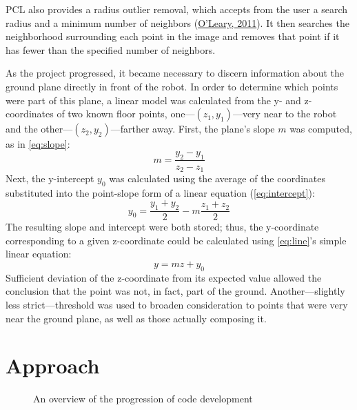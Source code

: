 \documentclass[12pt]{report}
\begin{document}
PCL also provides a radius outlier removal, which accepts from the user a search radius and a minimum number of neighbors (\hyperref[bib:oleary]{O'Leary, 2011}).  It then searches the neighborhood surrounding each point in the image and removes that point if it has fewer than the specified number of neighbors.

As the project progressed, it became necessary to discern information about the ground plane directly in front of the robot.  In order to determine which points were part of this plane, a linear model was calculated from the y- and z-coordinates of two known floor points, one---$(z_1,y_1)$---very near to the robot and the other---$(z_2,y_2)$---farther away.  First, the plane's slope $m$ was computed, as in \autoref{eq:slope}:
\begin{equation}
\label{eq:slope}
m=\frac{y_2-y_1}{z_2-z_1}
\end{equation}
Next, the y-intercept $y_0$ was calculated using the average of the coordinates substituted into the point-slope form of a linear equation (\autoref{eq:intercept}):
\begin{equation}
\label{eq:intercept}
y_0=\frac{y_1+y_2}{2}-m\frac{z_1+z_2}{2}
\end{equation}
The resulting slope and intercept were both stored; thus, the y-coordinate corresponding to a given z-coordinate could be calculated using \autoref{eq:line}'s simple linear equation:
\begin{equation}
\label{eq:line}
y=mz+y_0
\end{equation}
Sufficient deviation of the z-coordinate from its expected value allowed the conclusion that the point was not, in fact, part of the ground.  Another---slightly less strict---threshold was used to broaden consideration to points that were very near the ground plane, as well as those actually composing it.

\section{Approach}
\label{sec:approach}
\begin{figure}[h]
\begin{center}
\end{center}
\caption[Development cycle overview]{An overview of the progression of code development}
\label{fig:progressionbrief}
\end{figure}
\end{document}
